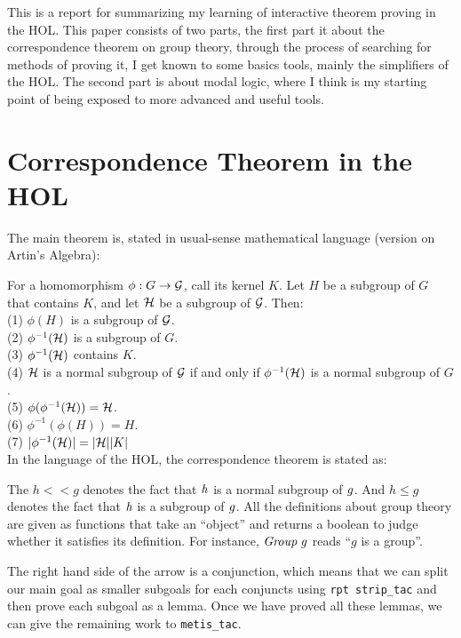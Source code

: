 \documentclass[letterpaper]{article}
\renewcommand{\HOLinline}[1]{\ensuremath{#1}}
\begin{document}
This is a report for summarizing my learning of interactive theorem proving in the HOL. This paper consists of two parts, the first part it about the correspondence theorem on group theory, through the process of searching for methods of proving it, I get known to some basics tools, mainly the simplifiers of the HOL. The second part is about modal logic, where I think is my starting point of being exposed to more advanced and useful tools.

\section{Correspondence Theorem in the HOL}

The main theorem is, stated in usual-sense mathematical language (version on Artin's Algebra):

For a homomorphism $\phi: G \to {\cal G}$, call its kernel $K$. Let $H$ be a subgroup of $G$ that contains $K$, and let ${\cal H}$ be a subgroup of ${\cal G}$.
Then: \\
(1) $\phi (H)$ is a subgroup of ${\cal G}$. \\
(2) $\phi^{-1}({\cal H})$ is a subgroup of $G$. \\
(3) $\phi^{-1}({\cal H})$ contains $K$. \\
(4) ${\cal H}$ is a normal subgroup of ${\cal G}$ if and only if $\phi^{-1}({\cal H})$ is a normal subgroup of $G$. \\
(5) $\phi (\phi^{-1}({\cal H})) = {\cal H}$. \\
(6) $\phi^{-1}(\phi (H)) = H$. \\
(7) $|\phi^{-1}({\cal H})| = |{\cal H}| |K|$ \\

In the language of the HOL, the correspondence theorem is stated as:


The $h < < g$ denotes the fact that \HOLinline{\HOLFreeVar{h}} is a normal subgroup of \HOLinline{\HOLFreeVar{g}}. And $h \le g$ denotes the fact that \HOLinline{\HOLFreeVar{h}} is a subgroup of \HOLinline{\HOLFreeVar{g}}. All the definitions about group theory are given as functions that take an ``object'' and returns a boolean to judge whether it satisfies its definition. For instance, \HOLinline{\HOLFreeVar{Group}\;\HOLFreeVar{g}} reads ``$g$ is a group''.

The right hand side of the arrow is a conjunction, which means that we can split our main goal as smaller subgoals for each conjuncts using \texttt{rpt strip_tac} and then prove each subgoal as a lemma. Once we have proved all these lemmas, we can give the remaining work to \texttt{metis_tac}.
\end{document}

